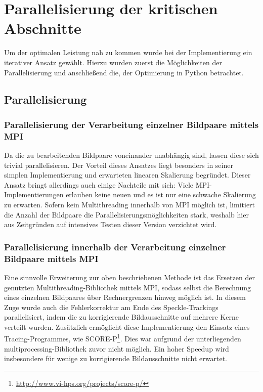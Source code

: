 \chapter{Parallelisierung der kritischen Abschnitte}

Um der optimalen Leistung nah zu kommen wurde bei der Implementierung ein iterativer Ansatz gewählt. Hierzu wurden zuerst die Möglichkeiten der Parallelisierung und anschließend die, der Optimierung in Python betrachtet. 

\section{Parallelisierung}

\subsection{Parallelisierung der Verarbeitung einzelner Bildpaare mittels MPI}

Da die zu bearbeitenden Bildpaare voneinander unabhängig sind, lassen diese sich trivial parallelisieren. Der Vorteil dieses Ansatzes liegt besonders in seiner simplen Implementierung und erwarteten linearen Skalierung begründet. Dieser Ansatz bringt allerdings auch einige Nachteile mit sich: Viele \gls{MPI}-Implementierungen erlauben keine neuen  und es ist nur eine schwache Skalierung zu erwarten. Sofern kein Multithreading innerhalb von \gls{MPI} möglich ist, limitiert die Anzahl der Bildpaare die Parallelisierungsmöglichkeiten stark, weshalb hier aus Zeitgründen auf intensives Testen dieser Version verzichtet wird. 

\subsection{Parallelisierung innerhalb der Verarbeitung einzelner Bildpaare mittels MPI}

Eine sinnvolle Erweiterung zur oben beschriebenen Methode ist das Ersetzen der genutzten Multithreading-Bibliothek mittels MPI, sodass selbst die Berechnung eines einzelnen Bildpaares über Rechnergrenzen hinweg möglich ist. In diesem Zuge wurde auch die Fehlerkorrektur am Ende des Speckle-Trackings parallelisiert, indem die zu korrigierende Bildausschnitte auf mehrere Kerne verteilt wurden. Zusätzlich ermöglicht diese Implementierung den Einsatz eines Tracing-Programmes, wie SCORE-P\footnote{\url{http://www.vi-hps.org/projects/score-p/}}. Dies war aufgrund der unterliegenden multiprocessing-Bibliothek zuvor nicht möglich. Ein hoher Speedup wird insbesondere für wenige zu korrigierende Bildausschnitte nicht erwartet. 


